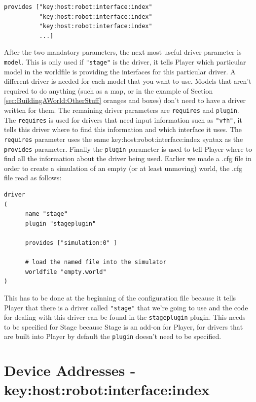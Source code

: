 \documentclass[a4paper]{report}
\newcommand{\pl}{Player\xspace}
\begin{document}
\begin{verbatim}
provides ["key:host:robot:interface:index" 
          "key:host:robot:interface:index"
          "key:host:robot:interface:index"
          ...]
\end{verbatim}

After the two mandatory parameters, the next most useful driver parameter is \verb|model|. This is only used if \verb|"stage"| is the driver, it tells \pl which particular model in the worldfile is providing the interfaces for this particular driver. A different driver is needed for each model that you want to use. 
Models that aren't required to do anything (such as a map, or in the example of Section \ref{sec:BuildingAWorld:OtherStuff} oranges and boxes) don't need to have a driver written for them.\newline
The remaining driver parameters are \verb|requires| and \verb|plugin|. The \verb|requires| is used for drivers that need input information such as \verb|"vfh"|, it tells this driver where to find this information and which interface it uses. 
The \verb|requires| parameter uses the same key:host:robot:interface:index syntax as the \verb|provides| parameter. Finally the \verb|plugin| parameter is used to tell \pl where to find all the information about the driver being used. 
Earlier we made a .cfg file in order to create a simulation of an empty (or at least unmoving) world, the .cfg file read as follows:
\begin{verbatim}
driver
(		
      name "stage"
      plugin "stageplugin"

      provides ["simulation:0" ]

      # load the named file into the simulator
      worldfile "empty.world"	
)
\end{verbatim}
This has to be done at the beginning of the configuration file because it tells \pl that there is a driver called \verb|"stage"| that we're going to use and the code for dealing with this driver can be found in the \verb|stageplugin| plugin. This needs to be specified for Stage because Stage is an add-on for \pl, for drivers that are built into \pl by default the \verb|plugin| doesn't need to be specified.

\section{Device Addresses - key:host:robot:interface:index} \label{sec:ConfigurationFile:DeviceAddress}
\end{document}
